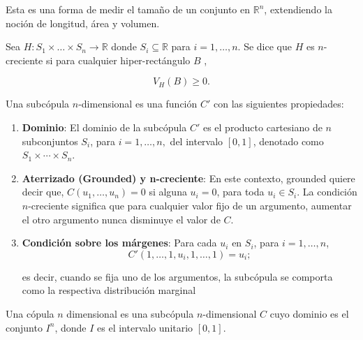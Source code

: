Esta es una forma de medir el tamaño de un conjunto en $\mathbb{R}^n$, extendiendo la noción de longitud, área y volumen.

\begin{defn}[$n$-creciente]
    Sea $H:S_1 \times \dots \times S_n \rightarrow \mathbb{R}$ donde $S_i \subseteq \mathbb{R}$ para $i = 1, \dots, n$. Se dice que $H$ es $n$-creciente si para cualquier hiper-rectángulo $B$ \cite{nelsenintroduction}, 

    \begin{equation}
         V_H(B) \geq 0.
    \end{equation}
\end{defn}


\begin{defn}
    Una subcópula $n$-dimensional es una función $C'$ con las siguientes propiedades:

    \begin{enumerate}
        \item \textbf{Dominio}: El dominio de la subcópula $C'$ es el producto cartesiano de $n$ subconjuntos $S_i$, para $ i = 1, \dots, n,$ del intervalo $[0, 1]$, denotado como $S_1 \times \cdots \times S_n$.

        \item \textbf{Aterrizado (Grounded) y n-creciente}: En este contexto, grounded quiere decir que, $C(u_1, \dots, u_n)=0$ si alguna $u_i = 0$, para toda $u_i \in S_i$. 
        La condición $n$-creciente significa que para cualquier valor fijo de un argumento, aumentar el otro argumento nunca disminuye el valor de $C$.

        \item \textbf{Condición sobre los márgenes}: Para cada $u_i$ en $S_i$, para $i =  1, \dots, n$, 
        \begin{equation}
            C'(1, \dots, 1, u_i, 1, \dots,  1) = u_i;
        \end{equation}

        es decir, cuando se fija uno de los argumentos, la subcópula se comporta como la respectiva distribución marginal
    \end{enumerate}
\end{defn}


\begin{defn}
    Una cópula $n$ dimensional es una subcópula $n$-dimensional $C$ cuyo dominio es el conjunto $I^n$, donde $I$ es el intervalo unitario $[0,1]$. 
\end{defn}




